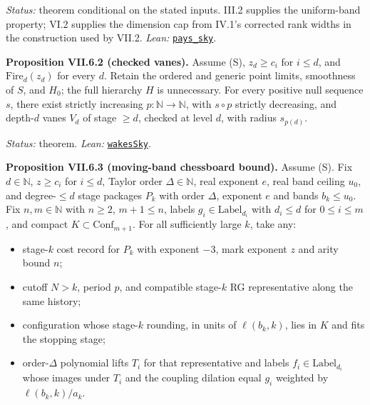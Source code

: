 \documentclass[
  letterpaper,
  11pt]{article}
\providecommand{\tightlist}{%
  \setlength{\itemsep}{0pt}\setlength{\parskip}{0pt}}
\begin{document}
\emph{Status:} theorem conditional on the stated inputs. III.2 supplies
the uniform-band property; VI.2 supplies the dimension cap from IV.1's
corrected rank widths in the construction used by VII.2. \emph{Lean:}
\href{https://github.com/yang-mills-group/OpenAI-YM-20261028/blob/3456e5e75cf8d4cd558955a5c7638fba2d68f464/YM/TraceExtension/Prom/Zoom/Running.lean\#L25-L31}{\texttt{pays\_sky}}.

\textbf{Proposition VII.6.2 (checked vanes).} Assume (S), \(z_d\ge c_i\)
for \(i\le d\), and \(\mathrm{Fire}_d(z_d)\) for every \(d\). Retain the
ordered and generic point limits, smoothness of \(S\), and \(H_0\); the
full hierarchy \(H\) is unnecessary. For every positive null sequence
\(s\), there exist strictly increasing \(p:\mathbb N\to\mathbb N\), with
\(s\circ p\) strictly decreasing, and depth-\(d\) vanes \(V_d\) of stage
\(\ge d\), checked at level \(d\), with radius \(s_{p(d)}\).

\emph{Status:} theorem. \emph{Lean:}
\href{https://github.com/yang-mills-group/OpenAI-YM-20261028/blob/3456e5e75cf8d4cd558955a5c7638fba2d68f464/YM/TraceExtension/Prom/Zoom/Boats.lean\#L75-L87}{\texttt{wakesSky}}.

\textbf{Proposition VII.6.3 (moving-band chessboard bound).} Assume (S).
Fix \(d\in\mathbb N\), \(z\ge c_i\) for \(i\le d\), Taylor order
\(\Delta\in\mathbb N\), real exponent \(e\), real band ceiling \(u_0\),
and degree-\(\le d\) stage packages \(P_k\) with order \(\Delta\),
exponent \(e\) and bands \(b_k\le u_0\). Fix \(n,m\in\mathbb N\) with
\(n\ge2\), \(m+1\le n\), labels \(g_i\in\mathrm{Label}_{d_i}\) with
\(d_i\le d\) for \(0\le i\le m\), and compact
\(K\subset\mathrm{Conf}_{m+1}\). For all sufficiently large \(k\), take
any:

\begin{itemize}
\tightlist
\item
  stage-\(k\) cost record for \(P_k\) with exponent \(-3\), mark
  exponent \(z\) and arity bound \(n\);
\item
  cutoff \(N>k\), period \(p\), and compatible stage-\(k\) RG
  representative along the same history;
\item
  configuration whose stage-\(k\) rounding, in units of \(\ell(b_k,k)\),
  lies in \(K\) and fits the stopping stage;
\item
  order-\(\Delta\) polynomial lifts \(T_i\) for that representative and
  labels \(f_i\in\mathrm{Label}_{d_i}\) whose images under \(T_i\) and
  the coupling dilation equal \(g_i\) weighted by \(\ell(b_k,k)/a_k\).
\end{itemize}
\end{document}
